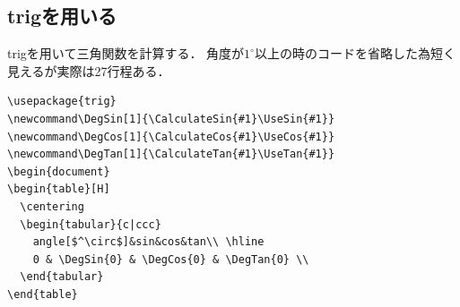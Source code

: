 \documentclass{ltjsarticle}
\newcommand\DegSin[1]{\CalculateSin{#1}\UseSin{#1}}
\newcommand\DegCos[1]{\CalculateCos{#1}\UseCos{#1}}
\newcommand\DegTan[1]{\CalculateTan{#1}\UseTan{#1}}
\begin{document}
\newpage
\subsection{trigを用いる}
trigを用いて三角関数を計算する．
角度が$1^\circ$以上の時のコードを省略した為短く見えるが実際は27行程ある．
\begin{lstlisting}[caption=trigを用いた表のコード]
\usepackage{trig}
\newcommand\DegSin[1]{\CalculateSin{#1}\UseSin{#1}}
\newcommand\DegCos[1]{\CalculateCos{#1}\UseCos{#1}}
\newcommand\DegTan[1]{\CalculateTan{#1}\UseTan{#1}}
\begin{document}
\begin{table}[H]
  \centering
  \begin{tabular}{c|ccc}
    angle[$^\circ$]&sin&cos&tan\\ \hline
    0 & \DegSin{0} & \DegCos{0} & \DegTan{0} \\
  \end{tabular}
\end{table}
\end{lstlisting}
\end{document}
